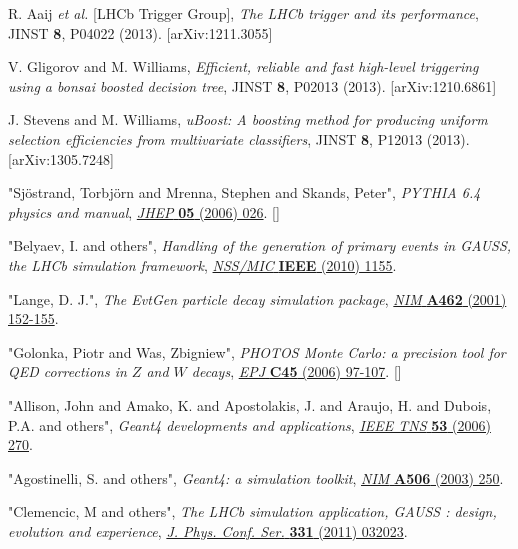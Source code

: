 \documentclass{JINST}
\theoremstyle{definition}
\theoremstyle{remark}
\begin{document}
\begin{thebibliography}{9}

R. Aaij {\em et al.} [LHCb Trigger Group], 
{\em The LHCb trigger and its performance}, 
JINST {\bf 8}, P04022 (2013). 
[arXiv:1211.3055]

V. Gligorov and M. Williams, 
{\em Efficient, reliable and fast high-level triggering using a bonsai boosted decision tree}, 
JINST {\bf 8}, P02013 (2013). 
[arXiv:1210.6861]

J. Stevens and M. Williams,
{\em uBoost: A boosting method for producing uniform selection efficiencies from multivariate classifiers}, 
JINST {\bf 8}, P12013 (2013). 
[arXiv:1305.7248]

{"Sj\"{o}strand, Torbj\"{o}rn and Mrenna, Stephen and Skands, Peter"},
\emph{PYTHIA 6.4 physics and manual},
\href{http://dx.doi.org/10.1088/1126-6708/2006/05/026}
{\emph{JHEP} {\bf 05} (2006) 026}.
[]

{"Belyaev, I. and others"},
\emph{Handling of the generation of primary events in GAUSS, the LHCb simulation framework},
\href{http://dx.doi.org/10.1109/NSSMIC.2010.5873949}
{\emph{NSS/MIC} {\bf IEEE} (2010) 1155}.

{"Lange, D. J."},
\emph{The EvtGen particle decay simulation package},
\href{http://dx.doi.org/10.1016/S0168-9002(01)00089-4}
{\emph{NIM} {\bf A462} (2001) 152-155}.

{"Golonka, Piotr and Was, Zbigniew"},
\emph{PHOTOS Monte Carlo: a precision tool for QED corrections in $Z$ and $W$ decays},
\href{http://dx.doi.org/10.1140/epjc/s2005-02396-4}
{\emph{EPJ} {\bf C45} (2006) 97-107}.
[]

{"Allison, John and Amako, K. and Apostolakis, J. and Araujo, H. and Dubois, P.A. and others"},
\emph{Geant4 developments and applications},
\href{http://dx.doi.org/10.1109/TNS.2006.869826}
{\emph{IEEE TNS} {\bf 53} (2006) 270}.

{"Agostinelli, S. and others"},
\emph{Geant4: a simulation toolkit},
\href{http://dx.doi.org/10.1016/S0168-9002(03)01368-8}
{\emph{NIM} {\bf A506} (2003) 250}.

{"Clemencic, M and others"},
\emph{The LHCb simulation application, GAUSS : design, evolution and experience},
\href{http://dx.doi.org/10.1088/1742-6596/331/3/032023}
{\emph{J. Phys. Conf. Ser.} {\bf 331} (2011) 032023}.


\end{thebibliography}
\end{document}
